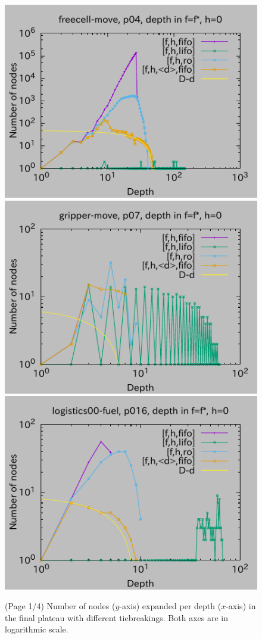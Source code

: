 \begin{figure}[htbp]
\includegraphics{img/depth/freecell-move/p04.pdf}
\includegraphics{img/depth/gripper-move/p07.pdf}
\includegraphics{img/depth/logistics00-fuel/p016.pdf}
 \caption{(Page 1/4) Number of nodes ($y$-axis) expanded per depth ($x$-axis) in
 the final plateau with different tiebreakings. Both axes are in logarithmic scale.
 }
 \label{fig:depth-histogram}
\end{figure}

